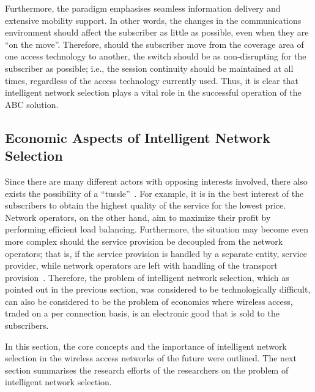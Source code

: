 Furthermore, the paradigm emphasises seamless information delivery and extensive mobility support. In other words, the changes in the communications environment should affect the subscriber as little as possible, even when they are ``on the move''. Therefore, should the subscriber move from the coverage area of one access technology to another, the switch should be as non-disrupting for the subscriber as possible; i.e., the session continuity should be maintained at all times, regardless of the access technology currently used. Thus, it is clear that intelligent network selection plays a vital role in the successful operation of the ABC solution.

\subsection{Economic Aspects of Intelligent Network Selection} %
\label{sub:economic_aspects_of_intelligent_network_selection_intelligent}
Since there are many different actors with opposing interests involved, there also exists the possibility of a ``tussle''~\cite{Clark02}. For example, it is in the best interest of the subscribers to obtain the highest quality of the service for the lowest price. Network operators, on the other hand, aim to maximize their profit by performing efficient load balancing. Furthermore, the situation may become even more complex should the service provision be decoupled from the network operators; that is, if the service provision is handled by a separate entity, service provider, while network operators are left with handling of the transport provision~\cite{DMBushTussle09}. Therefore, the problem of intelligent network selection, which as pointed out in the previous section, was considered to be technologically difficult, can also be considered to be the problem of economics where wireless access, traded on a per connection basis, is an electronic good that is sold to the subscribers.

In this section, the core concepts and the importance of intelligent network selection in the wireless access networks of the future were outlined. The next section summarises the research efforts of the researchers on the problem of intelligent network selection.

